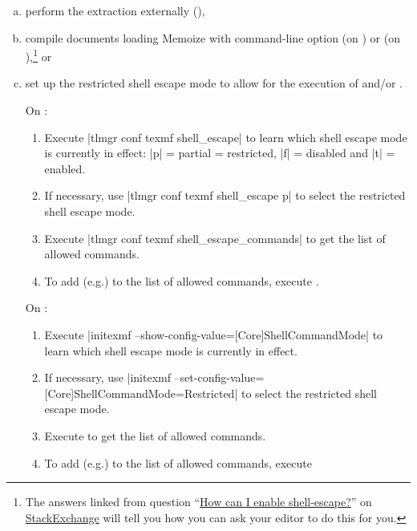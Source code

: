 \documentclass[a4paper,11pt]{article}
\begin{document}
\begin{enumerate}[(a)]
\item\label{item:fallback-external} perform the extraction externally
  (),
\item\label{item:fallback-full} compile documents loading Memoize with
  command-line option  (on \TeXLive) or
   (on \MiKTeX),\footnote{The answers linked
    from question ``\href{https://tex.stackexchange.com/q/598818/16819}{How can
      I enable shell-escape?}''
    on \href{https://tex.stackexchange.com}{ StackExchange} will
    tell you how you can ask your editor to do this for you.} or
\item\label{item:fallback-restricted} set up the restricted shell escape mode
  to allow for the execution of  and/or
  .
  
  On \TeXLive:
  \begin{enumerate}[1.]
  \item Execute |tlmgr conf texmf shell_escape| to learn which shell escape
    mode is currently in effect: |p| = partial = restricted, |f| = disabled and
    |t| = enabled.
  \item If necessary, use |tlmgr conf texmf shell_escape p| to select the
    restricted shell escape mode.
  \item Execute |tlmgr conf texmf shell_escape_commands| to get the
     list of allowed commands.
  \item To add (e.g.)  to the list of allowed
    commands, execute .
  \end{enumerate}

  On \MiKTeX:
  \begin{enumerate}[1.]
  \item Execute |initexmf --show-config-value=[Core]ShellCommandMode| to learn
    which shell escape mode is currently in effect.
  \item If necessary, use |initexmf
    --set-config-value=[Core]ShellCommandMode=Restricted| to select the
    restricted shell escape mode.
  \item Execute  to get the
     list of allowed commands.
  \item To add (e.g.)  to the list of allowed
    commands, execute 
  \end{enumerate}
\end{enumerate}
\end{document}
